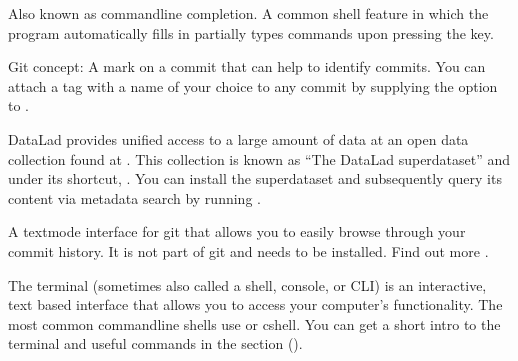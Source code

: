 \begin{description}
\ignorespaces 
\sphinxAtStartPar
Also known as command\sphinxhyphen{}line completion. A common shell feature in which
the program automatically fills in partially types commands upon
pressing the  key.

\ignorespaces 
\sphinxAtStartPar
Git concept: A mark on a commit that can help to identify commits. You can attach
a tag with a name of your choice to any commit by supplying the 
option to .

\sphinxAtStartPar
DataLad provides unified access to a large amount of data at an open data
collection found at .
This collection is known as “The DataLad superdataset” and under its shortcut,
\sphinxcode{\sphinxupquote{///}}. You can install the superdataset \textendash{} and subsequently query its content via metadata
search \textendash{} by running .

\ignorespaces 
\sphinxAtStartPar
A text\sphinxhyphen{}mode interface for git that allows you to easily browse through your commit history.
It is not part of git and needs to be installed. Find out more .

\sphinxAtStartPar
The terminal (sometimes also called a shell, console, or CLI) is an interactive, text based interface that allows you to access your computer’s functionality.
The most common command\sphinxhyphen{}line shells use {\hyperref[\detokenize{glossary:term-bash}]{}} or c\sphinxhyphen{}shell.
You can get a short intro to the terminal and useful commands in the section {\hyperref[\detokenize{intro/howto:howto}]{}} ().


\end{description}
